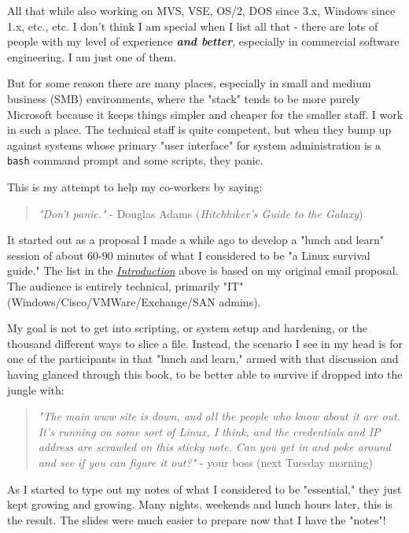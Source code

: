 \documentclass[10pt,american,]{book}
\numberwithin{figure}{chapter}
\begin{document}
All that while also working on MVS, VSE, OS/2, DOS since 3.x, Windows
since 1.x, etc., etc. I don't think I am special when I list all that -
there are lots of people with my level of experience \textbf{\emph{and
better}}, especially in commercial software engineering. I am just one
of them.

But for some reason there are many places, especially in small and
medium business (SMB) environments, where the "stack" tends to be more
purely Microsoft because it keeps things simpler and cheaper for the
smaller staff. I work in such a place. The technical staff is quite
competent, but when they bump up against systems whose primary "user
interface" for system administration is a \texttt{bash} command prompt
and some scripts, they panic.

This is my attempt to help my co-workers by saying:

\begin{quote}
\emph{"Don't panic."} - Douglas Adams (\emph{Hitchhiker's Guide to the
Galaxy})
\end{quote}

It started out as a proposal I made a while ago to develop a "lunch and
learn" session of about 60-90 minutes of what I considered to be "a
Linux survival guide." The list in the
\protect\hyperlink{introduction}{\emph{Introduction}} above is based on
my original email proposal. The audience is entirely technical,
primarily "IT" (Windows/Cisco/VMWare/Exchange/SAN admins).

My goal is not to get into scripting, or system setup and hardening, or
the thousand different ways to slice a file. Instead, the scenario I see
in my head is for one of the participants in that "lunch and learn,"
armed with that discussion and having glanced through this book, to be
better able to survive if dropped into the jungle with:

\begin{quote}
\emph{"The main www site is down, and all the people who know about it
are out. It's running on some sort of Linux, I think, and the
credentials and IP address are scrawled on this sticky note. Can you get
in and poke around and see if you can figure it out?"} - your boss (next
Tuesday morning)
\end{quote}

As I started to type out my notes of what I considered to be
"essential," they just kept growing and growing. Many nights, weekends
and lunch hours later, this is the result. The slides were much easier
to prepare now that I have the "notes"!
\end{document}
